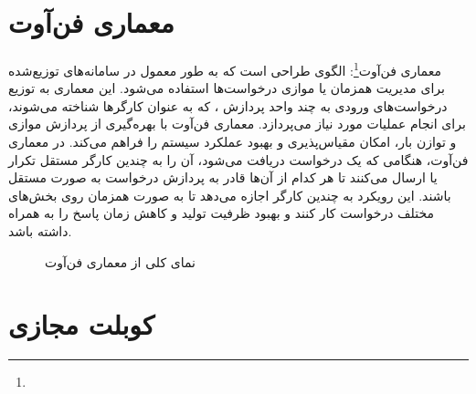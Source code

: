 \section{معماری فن‌آوت}
\label{sec:fanout}
\paragraph{}
{
    معماری فن‌آوت\footnote{}: الگوی طراحی است که به طور معمول در سامانه‌های توزیع‌شده برای مدیریت همزمان یا موازی درخواست‌ها استفاده می‌شود. این معماری به توزیع درخواست‌های ورودی به چند واحد پردازش ، که به عنوان کارگرها شناخته می‌شوند، برای انجام عملیات مورد نیاز می‌پردازد. معماری فن‌آوت با بهره‌گیری از پردازش موازی و توازن بار، امکان مقیاس‌پذیری و بهبود عملکرد سیستم را فراهم می‌کند. در معماری فن‌آوت، هنگامی که یک درخواست دریافت می‌شود، آن را به چندین کارگر مستقل تکرار یا ارسال می‌کنند تا هر کدام از آن‌ها قادر به پردازش درخواست به صورت مستقل باشند. این رویکرد به چندین کارگر اجازه می‌دهد تا به صورت همزمان روی بخش‌های مختلف درخواست کار کنند و بهبود ظرفیت تولید و کاهش زمان پاسخ را به همراه داشته باشد.
    \begin{figure}[H]
        \caption{نمای کلی از معماری فن‌آوت}
        \label{fig:fanout}
    \end{figure}
}

\section{کوبلت مجازی}
\label{sec:vritkubelet}
